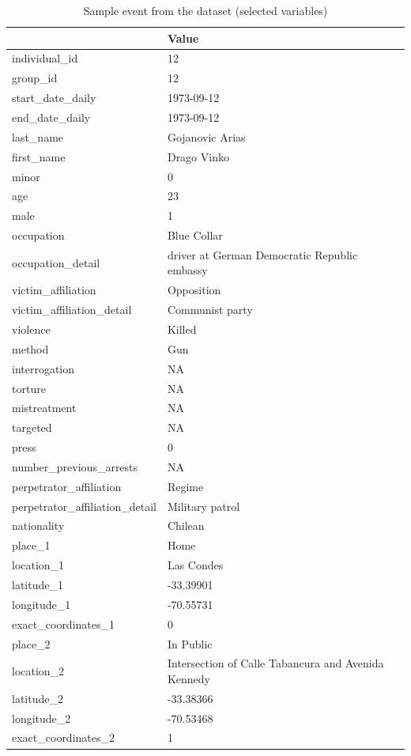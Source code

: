 \documentclass[12pt,a4paper,]{article}
\begin{document}
\begin{table}[!h]

\caption{\label{tab:sample-obs}Sample event from the dataset (selected variables)}
\centering
\begin{tabular}{ll}
\toprule
  & Value\\
\midrule
individual\_id & 12\\
group\_id & 12\\
start\_date\_daily & 1973-09-12\\
end\_date\_daily & 1973-09-12\\
last\_name & Gojanovic Arias\\
\addlinespace
first\_name & Drago Vinko\\
minor & 0\\
age & 23\\
male & 1\\
occupation & Blue Collar\\
\addlinespace
occupation\_detail & driver at German Democratic Republic embassy\\
victim\_affiliation & Opposition\\
victim\_affiliation\_detail & Communist party\\
violence & Killed\\
method & Gun\\
\addlinespace
interrogation & NA\\
torture & NA\\
mistreatment & NA\\
targeted & NA\\
press & 0\\
\addlinespace
number\_previous\_arrests & NA\\
perpetrator\_affiliation & Regime\\
perpetrator\_affiliation\_detail & Military patrol\\
nationality & Chilean\\
place\_1 & Home\\
\addlinespace
location\_1 & Las Condes\\
latitude\_1 & -33.39901\\
longitude\_1 & -70.55731\\
exact\_coordinates\_1 & 0\\
place\_2 & In Public\\
\addlinespace
location\_2 & Intersection of Calle Tabancura and Avenida Kennedy\\
latitude\_2 & -33.38366\\
longitude\_2 & -70.53468\\
exact\_coordinates\_2 & 1\\
\bottomrule
\end{tabular}
\end{table}
\end{document}
